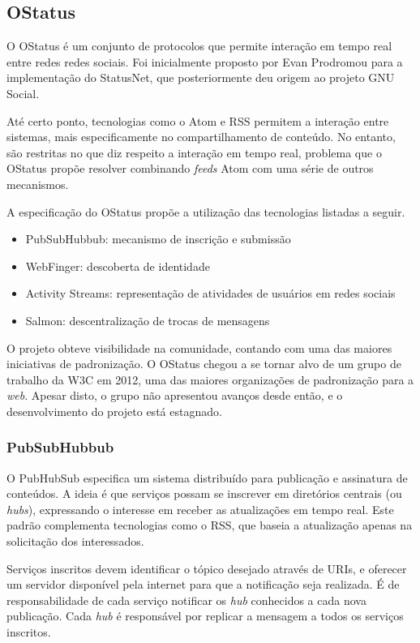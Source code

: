 \subsection{OStatus}

O OStatus é um conjunto de protocolos que permite interação em tempo real entre
redes redes sociais. Foi inicialmente proposto por Evan Prodromou para a
implementação do StatusNet, que posteriormente deu origem ao projeto GNU Social.

Até certo ponto, tecnologias como o Atom e RSS permitem a interação entre sistemas,
mais especificamente no compartilhamento de conteúdo. No entanto, são restritas no
que diz respeito a interação em tempo real, problema que o OStatus propõe resolver
combinando \textit{feeds} Atom com uma série de outros mecanismos.

A especificação do OStatus propõe a utilização das tecnologias listadas a seguir.

\begin{itemize}
  \item{PubSubHubbub: mecanismo de inscrição e submissão}
  \item{WebFinger: descoberta de identidade}
  \item{Activity Streams: representação de atividades de usuários em redes sociais}
  \item{Salmon: descentralização de trocas de mensagens}
\end{itemize}

O projeto obteve visibilidade na comunidade, contando com uma das maiores
iniciativas de padronização. O OStatus chegou a se tornar alvo de um grupo de
trabalho da W3C em 2012, uma das maiores organizações de padronização para a
\textit{web}. Apesar disto, o grupo não apresentou avanços desde então, e o
desenvolvimento do projeto está estagnado.

\subsubsection{PubSubHubbub}

O PubHubSub especifica um sistema distribuído para publicação e assinatura de
conteúdos. A ideia é que serviços possam se inscrever em diretórios centrais (ou
\textit{hubs}), expressando o interesse em receber as atualizações em tempo real.
Este padrão complementa tecnologias como o RSS, que baseia a atualização apenas na
solicitação dos interessados.

Serviços inscritos devem identificar o tópico desejado através de URIs, e oferecer
um servidor disponível pela internet para que a notificação seja realizada. É de
responsabilidade de cada serviço notificar os \textit{hub} conhecidos a cada nova
publicação. Cada \textit{hub} é responsável por replicar a mensagem a todos os
serviços inscritos.

